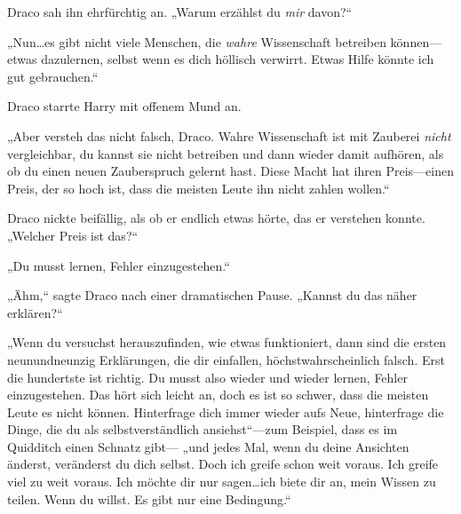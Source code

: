 Draco sah ihn ehrfürchtig an. „Warum erzählst du \emph{mir} davon?“

„Nun…es gibt nicht viele Menschen, die \emph{wahre} Wissenschaft betreiben können—etwas dazulernen, selbst wenn es dich höllisch verwirrt. Etwas Hilfe könnte ich gut gebrauchen.“

Draco starrte Harry mit offenem Mund an.

„Aber versteh das nicht falsch, Draco. Wahre Wissenschaft ist mit Zauberei \emph{nicht} vergleichbar, du kannst sie nicht betreiben und dann wieder damit aufhören, als ob du einen neuen Zauberspruch gelernt hast. Diese Macht hat ihren Preis—einen Preis, der so hoch ist, dass die meisten Leute ihn nicht zahlen wollen.“

Draco nickte beifällig, als ob er endlich etwas hörte, das er verstehen konnte. „Welcher Preis ist das?“

„Du musst lernen, Fehler einzugestehen.“

„Ähm,“ sagte Draco nach einer dramatischen Pause. „Kannst du das näher erklären?“

„Wenn du versuchst herauszufinden, wie etwas funktioniert, dann sind die ersten neunundneunzig Erklärungen, die dir einfallen, höchstwahrscheinlich falsch. Erst die hundertste ist richtig. Du musst also wieder und wieder lernen, Fehler einzugestehen. Das hört sich leicht an, doch es ist so schwer, dass die meisten Leute es nicht können. Hinterfrage dich immer wieder aufs Neue, hinterfrage die Dinge, die du als selbstverständlich ansiehst“—zum Beispiel, dass es im Quidditch einen Schnatz gibt— „und jedes Mal, wenn du deine Ansichten änderst, veränderst du dich selbst. Doch ich greife schon weit voraus. Ich greife viel zu weit voraus. Ich möchte dir nur sagen…ich biete dir an, mein Wissen zu teilen. Wenn du willst. Es gibt nur eine Bedingung.“

